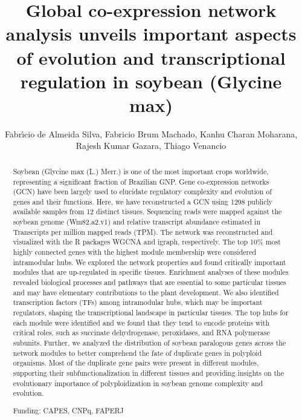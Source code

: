 \documentclass[twoside]{article}
\title{\vspace{-15mm}\fontsize{24pt}{10pt}\selectfont\textbf{ Global co-expression network analysis unveils important aspects of evolution and transcriptional regulation in soybean (Glycine max) }} %
\author{ Fabr\'{\i}cio de Almeida Silva, Fabricio Brum Machado, Kanhu Charan Moharana, Rajesh Kumar Gazara, Thiago Venancio }
\affil{ Universidade Estadual do Norte Fluminense Darcy Ribeiro }
\date{}
\begin{document}
  
  
  \maketitle %
  
  
  \thispagestyle{fancy} %
  
  
  \begin{abstract}
  Soybean (Glycine max (L.) Merr.) is one of the most important crops worldwide,  representing a significant fraction of Brazilian GNP. Gene co-expression networks (GCN) have been largely used to elucidate regulatory complexity and evolution of genes and their functions. Here,  we have reconstructed a GCN using 1298 publicly available samples from 12 distinct tissues. Sequencing reads were mapped against the soybean genome (Wm82.a2.v1) and relative transcript abundance estimated in Transcripts per million mapped reads (TPM). The network was reconstructed and visualized with the R packages WGCNA and igraph,  respectively. The top 10\% most highly connected genes with the highest module membership were considered intramodular hubs. We explored the network properties and found critically important modules that are up-regulated in specific tissues. Enrichment analyses of these modules revealed biological processes and pathways that are essential to some particular tissues and may have elementary contributions to the plant development. We also identified transcription factors (TFs) among intramodular hubs,  which may be important regulators,  shaping the transcriptional landscape in particular tissues. The top hubs for each module were identified and we found that they tend to encode proteins with critical roles,  such as succinate dehydrogenase,  peroxidases,  and RNA polymerase subunits. Further,  we analyzed the distribution of soybean paralogous genes across the network modules to better comprehend the fate of duplicate genes in polyploid organisms. Most of the duplicate gene pairs were present in different modules,  supporting their subfunctionalization in different tissues and providing insights on the evolutionary importance of polyploidization in soybean genome complexity and evolution.
  
  Funding: CAPES,  CNPq,  FAPERJ \\ 
  \end{abstract}
  
\end{document}
